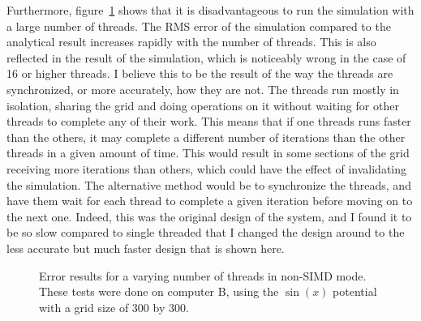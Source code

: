 Furthermore, figure~\ref{fig:err-numthreads} shows that it is disadvantageous to run the simulation with
a large number of threads. The RMS error of the simulation compared to the analytical result increases
rapidly with the number of threads. This is also reflected in the result of the simulation, which is
noticeably wrong in the case of 16 or higher threads. I believe this to be the result of the way the threads
are synchronized, or more accurately, how they are not. The threads run mostly in isolation, sharing the
grid and doing operations on it without waiting for other threads to complete any of their work. This means
that if one threads runs faster than the others, it may complete a different number of iterations than the other
threads in a given amount of time. This would result in some sections of the grid receiving more iterations
than others, which could have the effect of invalidating the simulation. The alternative method would be
to synchronize the threads, and have them wait for each thread to complete a given iteration before moving on
to the next one. Indeed, this was the original design of the system, and I found it to be so slow compared to
single threaded that I changed the design around to the less accurate but much faster design that is shown here.



\begin{figure}[h]
	\centering
\caption{Error results for a varying number of threads in non-SIMD mode. These
tests were done on computer B, using the $\sin(x)$ potential with a grid size of 300 by 300.}
\label{fig:err-numthreads}
\end{figure}



